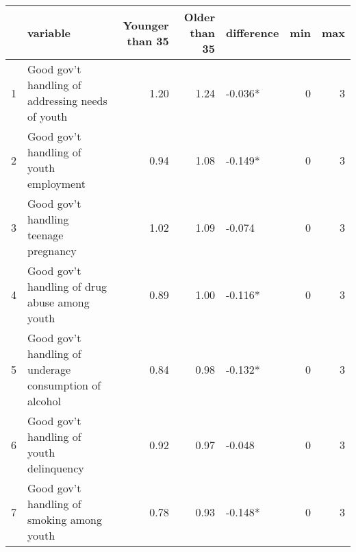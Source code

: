 \begingroup\fontsize{15}{17}\selectfont

\begin{tabular}{l|l|r|r|l|r|r}
\hline
  & variable & Younger than 35 & Older than 35 & difference & min & max\\
\hline
1 & Good gov't handling of addressing needs of youth & 1.20 & 1.24 & -0.036* & 0 & 3\\
\hline
2 & Good gov't handling of youth employment & 0.94 & 1.08 & -0.149* & 0 & 3\\
\hline
3 & Good gov't handling teenage pregnancy & 1.02 & 1.09 & -0.074 & 0 & 3\\
\hline
4 & Good gov't handling of drug abuse among youth & 0.89 & 1.00 & -0.116* & 0 & 3\\
\hline
5 & Good gov't handling of underage consumption of alcohol & 0.84 & 0.98 & -0.132* & 0 & 3\\
\hline
6 & Good gov't handling of youth delinquency & 0.92 & 0.97 & -0.048 & 0 & 3\\
\hline
7 & Good gov't handling of smoking among youth & 0.78 & 0.93 & -0.148* & 0 & 3\\
\hline
\end{tabular}
\endgroup{}
